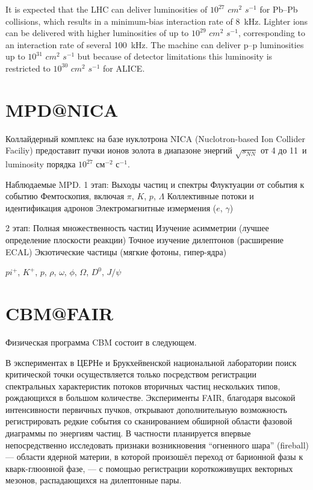 It is expected that the LHC can deliver luminosities of $10^{27}$ $cm^{2}$ $s^{-1}$ for Pb--Pb collisions, which results in a minimum-bias interaction rate of 8~kHz. Lighter ions can be delivered with higher luminosities of up to $10^{29}$ $cm^{2}$ $s^{-1}$, corresponding to an interaction rate of several 100~kHz. The machine can deliver p--p luminosities up to $10^{31}$ $cm^{2}$ $s^{-1}$ but because of detector limitations this luminosity is restricted to $10^{30}$ $cm^{2}$ $s^{-1}$ for ALICE.

\section{MPD@NICA}

Коллайдерный комплекс на базе нуклотрона NICA (Nuclotron-based Ion Collider Faciliy) предоставит пучки ионов золота в диапазоне энергий $\sqrt{s_{NN}}$ от 4 до 11~\GeVperNucl и luminosity порядка $10^{27}$ см$^{-2}$ с$^{-1}$.



Наблюдаемые MPD.
1 этап:
Выходы частиц и спектры
Флуктуации от события к событию
Фемтоскопия, включая $\pi$, $K$, $p$, $\Lambda$
Коллективные потоки и идентификация адронов
Электромагнитные измермения ($e$, $\gamma$)

2 этап:
Полная множественность частиц
Изучение асимметрии (лучшее определение плоскости реакции)
Точное изучение дилептонов (расширение ECAL)
Экзотические частицы (мягкие фотоны, гипер-ядра)


$pi^{+}$, $K^{+}$, $p$, $\rho$, $\omega$, $\phi$, $\Omega$, $D^{0}$, $J/\psi$

\section{CBM@FAIR}

Физическая программа CBM состоит в следующем.

В экспериментах в ЦЕРНе и Брукхейвенской национальной лаборатории поиск критической точки осуществляется только посредством регистрации спектральных характеристик потоков вторичных частиц нескольких типов, рождающихся в большом количестве. Эксперименты FAIR, благодаря высокой интенсивности первичных пучков, открывают дополнительную возможность регистрировать редкие события со сканированием обширной области фазовой диаграммы по энергиям частиц. В частности планируется впервые непосредственно исследовать признаки возникновения ``огненного шара'' (fireball) --- области ядерной материи, в которой произошёл переход от барионной фазы к кварк-глюонной фазе, --- с помощью регистрации короткоживущих векторных мезонов, распадающихся на дилептонные пары.

